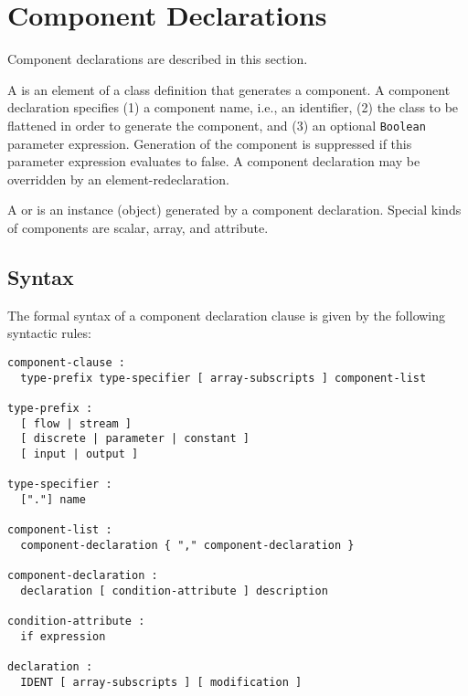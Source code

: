 \section{Component Declarations}\label{component-declarations}

Component declarations are described in this section.

A  is an element of a class definition that generates a component.
A component declaration specifies (1) a component name, i.e., an identifier, (2) the class to be flattened in order to generate the component, and (3) an optional \lstinline!Boolean! parameter expression.
Generation of the component is suppressed if this parameter expression evaluates to false.
A component declaration may be overridden by an element-redeclaration.

A  or  is an instance (object) generated by a component declaration.
Special kinds of components are scalar, array, and attribute.

\subsection{Syntax}\label{component-declaration-syntax}\label{syntax-and-examples-of-component-declarations}

The formal syntax of a component declaration clause is given by the following syntactic rules:
\begin{lstlisting}[language=grammar]
component-clause :
  type-prefix type-specifier [ array-subscripts ] component-list

type-prefix :
  [ flow | stream ]
  [ discrete | parameter | constant ]
  [ input | output ]

type-specifier :
  ["."] name

component-list :
  component-declaration { "," component-declaration }

component-declaration :
  declaration [ condition-attribute ] description

condition-attribute :
  if expression

declaration :
  IDENT [ array-subscripts ] [ modification ]
\end{lstlisting}

